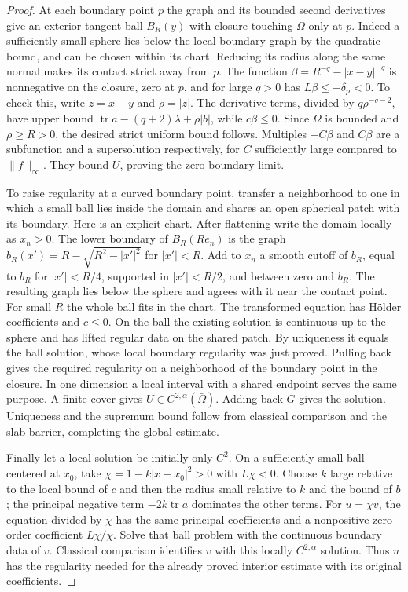 \documentclass[11pt,oneside,openany]{book}
\theoremstyle{plain}
\theoremstyle{definition}
\theoremstyle{remark}
\begin{document}
\begin{proof}
At each boundary point \(p\) the graph and its bounded
second derivatives give an exterior tangent ball
\(B_R(y)\) with closure touching \(\bar\Omega\) only at \(p\).
Indeed a sufficiently small sphere lies below the local
boundary graph by the quadratic bound, and can be chosen
within its chart. Reducing its radius along the same
normal makes its contact strict away from \(p\).
The function
\(\beta=R^{-q}-|x-y|^{-q}\) is nonnegative on the closure,
zero at \(p\), and for large \(q>0\) has \(L\beta\leq-\delta_p<0\).
To check this, write \(z=x-y\) and \(\rho=|z|\).
The derivative terms, divided by \(q\rho^{-q-2}\),
have upper bound
\(\operatorname{tr}a-(q+2)\lambda+\rho|b|\), while
\(c\beta\leq0\). Since \(\Omega\) is bounded and
\(\rho\geq R>0\), the desired strict uniform bound follows.
Multiples \(-C\beta\) and \(C\beta\) are a subfunction
and a supersolution respectively, for \(C\) sufficiently
large compared to \(\|f\|_\infty\).
They bound \(U\), proving the zero boundary limit.

To raise regularity at a curved boundary point, transfer
a neighborhood to one in which a small ball lies inside
the domain and shares an open spherical patch with its
boundary. Here is an explicit chart. After flattening
write the domain locally as \(x_n>0\).
The lower boundary of \(B_R(Re_n)\) is the graph
\(b_R(x')=R-\sqrt{R^2-|x'|^2}\) for \(|x'|<R\).
Add to \(x_n\) a smooth cutoff of \(b_R\), equal to \(b_R\)
for \(|x'|<R/4\), supported in \(|x'|<R/2\), and between
zero and \(b_R\). The resulting graph lies below the
sphere and agrees with it near the contact point.
For small \(R\) the whole ball fits in the chart.
The transformed equation has Hölder coefficients and
\(c\leq0\). On the ball the existing solution is
continuous up to the sphere and has lifted regular
data on the shared patch. By uniqueness it equals the
ball solution, whose local boundary regularity was
just proved. Pulling back gives the required regularity
on a neighborhood of the boundary point in the closure.
In one dimension a local interval with a shared endpoint
serves the same purpose.
A finite cover gives \(U\in C^{2,\alpha}(\bar\Omega)\).
Adding back \(G\) gives the solution. Uniqueness and the
supremum bound follow from classical comparison and the
slab barrier, completing the global estimate.

Finally let a local solution be initially only \(C^2\).
On a sufficiently small ball centered at \(x_0\), take
\(\chi=1-k|x-x_0|^2>0\) with \(L\chi<0\).
Choose \(k\) large relative to the local bound of \(c\)
and then the radius small relative to \(k\) and the
bound of \(b\); the principal negative term
\(-2k\operatorname{tr}a\) dominates the other terms.
For \(u=\chi v\), the equation divided by \(\chi\)
has the same principal coefficients and a nonpositive
zero-order coefficient \(L\chi/\chi\).
Solve that ball problem with the continuous boundary
data of \(v\). Classical comparison identifies \(v\)
with this locally \(C^{2,\alpha}\) solution. Thus
\(u\) has the regularity needed for the already proved
interior estimate with its original coefficients.
\end{proof}
\end{document}
